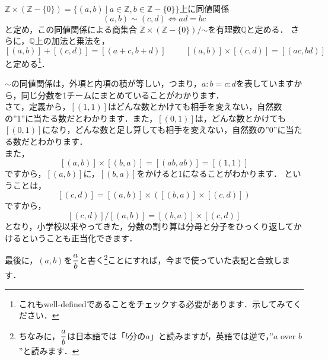 \begin{defi}[有理数]
$\mathbb{Z}\times(\mathbb{Z}-\{0\})=\{(a,b)\ |\
 a\in\mathbb{Z},b\in\mathbb{Z}-\{0\}\}$上に同値関係
 \[
  (a,b)\sim(c,d)\Leftrightarrow ad=bc
 \]
 と定め，この同値関係による商集合
 $\mathbb{Z}\times(\mathbb{Z}-\{0\})/\mathord{\sim}$を有理数$\mathbb{Q}$と定める．
 さらに，$\mathbb{Q}$上の加法と乗法を，
 \[
  [(a,b)]+[(c,d)]=[(a+c,b+d)]\hspace{1cm}[(a,b)]\times[(c,d)]=[(ac,bd)]
 \]
 と定める\footnote{これもwell-definedであることをチェックする必要があります．示してみてください．}．
\end{defi}

$\sim$の同値関係は，外項と内項の積が等しい，つまり，$a:b=c:d$を表していますから，同じ分数を1チームにまとめていることがわかります．\\
さて，定義から，$[(1,1)]$はどんな数とかけても相手を変えない，自然数の''1''に当たる数だとわかります．また，$[(0,1)]$は，どんな数とかけても$[(0,1)]$になり，どんな数と足し算しても相手を変えない，自然数の''0''に当たる数だとわかります．\\
また，
\[
 [(a,b)]\times[(b,a)]=[(ab,ab)]=[(1,1)]
\]
ですから，$[(a,b)]$に，$[(b,a)]$をかけると1になることがわかります．
ということは，
\[
 [(c,d)]=[(a,b)]\times([(b,a)]\times[(c,d)])
\]
ですから，
\[
 [(c,d)]/[(a,b)]=[(b,a)]\times[(c,d)]
\]
となり，小学校以来やってきた，分数の割り算は分母と分子をひっくり返してかけるということも正当化できます．

最後に，$(a,b)$を$\displaystyle\frac{a}{b}$と書く\footnote{ちなみに，$\displaystyle\frac{a}{b}$は日本語では「$b$分の$a$」と読みますが，英語では逆で，''$a$ over $b$''と読みます．}ことにすれば，今まで使っていた表記と合致します．


